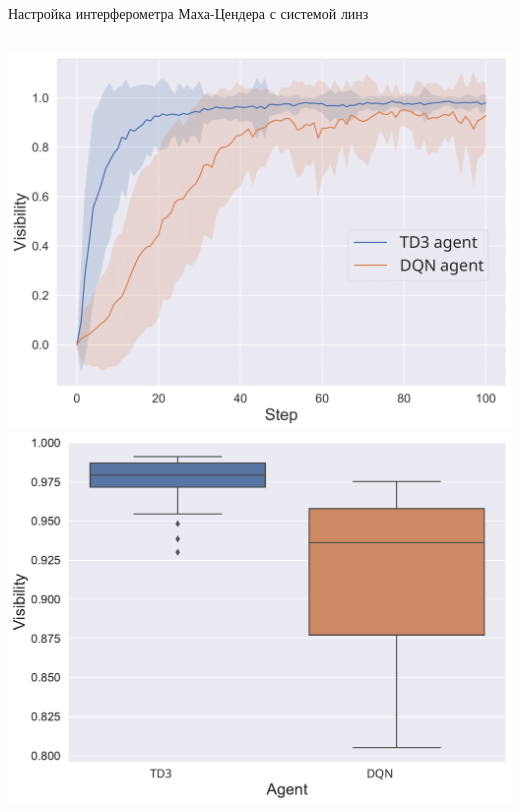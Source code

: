 \begin{frame}[allowframebreaks]{Настройка интерферометра Маха-Цендера с системой линз}
\begin{columns}
\centering
\includegraphics[width=1\linewidth]{Presentation/images/DQN_vs_TD3.png}
\centering
\includegraphics[width=1\linewidth]{images/DQN_vs_TD3_box.pdf}
\end{columns}


\end{frame}

